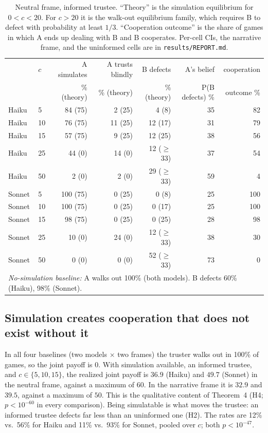 \documentclass[11pt]{article}
\begin{document}
\begin{table}[t]
\centering\small
\begin{tabular}{llrrrrr}
\toprule
 & $c$ & A simulates & A trusts blindly & B defects & A's belief & cooperation \\
 &  & \% (theory) & \% (theory) & \% (theory) & P(B defects) \% & outcome \% \\
\midrule
Haiku & 5 & 84 (75) & 2 (25) & 4 (8) & 35 & 82 \\
Haiku & 10 & 76 (75) & 11 (25) & 12 (17) & 31 & 79 \\
Haiku & 15 & 57 (75) & 9 (25) & 12 (25) & 38 & 56 \\
Haiku & 25 & 44 (0) & 14 (0) & 12 ($\geq$33) & 37 & 54 \\
Haiku & 50 & 2 (0) & 2 (0) & 29 ($\geq$33) & 59 & 4 \\
\addlinespace
Sonnet & 5 & 100 (75) & 0 (25) & 0 (8) & 25 & 100 \\
Sonnet & 10 & 100 (75) & 0 (25) & 0 (17) & 25 & 100 \\
Sonnet & 15 & 98 (75) & 0 (25) & 0 (25) & 28 & 98 \\
Sonnet & 25 & 10 (0) & 24 (0) & 12 ($\geq$33) & 38 & 30 \\
Sonnet & 50 & 0 (0) & 0 (0) & 52 ($\geq$33) & 73 & 0 \\
\midrule
\multicolumn{7}{l}{\emph{No-simulation baseline:} A walks out 100\% (both models). B defects 60\% (Haiku), 98\% (Sonnet).}\\
\bottomrule
\end{tabular}
\caption{Neutral frame, informed trustee. ``Theory'' is the simulation equilibrium for $0<c<20$. For $c>20$ it is the walk-out equilibrium family, which requires B to defect with probability at least $1/3$. ``Cooperation outcome'' is the share of games in which A ends up dealing with B and B cooperates. Per-cell CIs, the narrative frame, and the uninformed cells are in \texttt{results/REPORT.md}.}
\label{tab:main}
\end{table}

\subsection{Simulation creates cooperation that does not exist without it}
In all four baselines (two models $\times$ two frames) the truster walks out in 100\% of games, so the joint payoff is $0$. With simulation available, an informed trustee, and $c\in\{5,10,15\}$, the realized joint payoff is $36.9$ (Haiku) and $49.7$ (Sonnet) in the neutral frame, against a maximum of $60$. In the narrative frame it is $32.9$ and $39.5$, against a maximum of $50$. This is the qualitative content of Theorem~4 (H4; $p<10^{-60}$ in every comparison). Being simulatable is what moves the trustee: an informed trustee defects far less than an uninformed one (H2). The rates are 12\% vs.\ 56\% for Haiku and 11\% vs.\ 93\% for Sonnet, pooled over $c$; both $p<10^{-47}$.
\end{document}
